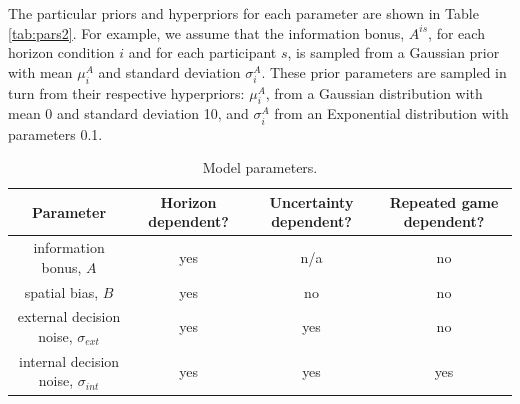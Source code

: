 \documentclass[12pt]{article}
\begin{document}
	The particular priors and hyperpriors for each parameter are shown in Table \ref{tab:pars2}. For example, we assume that the information bonus, $A^{is}$, for each horizon condition $i$ and for each participant $s$, is sampled from a Gaussian prior with mean $\mu^{A}_{i}$ and standard deviation $\sigma_{i}^A$. These prior parameters are sampled in turn from their respective hyperpriors: $\mu_{i}^{A}$, from a Gaussian distribution with mean 0 and standard deviation 10, and $\sigma_{i}^A$ from an Exponential distribution with parameters 0.1.
	\begin{table}[H]
		\small
		\begin{center}
			\begin{tabular}{|c|c|c|c|}
				\hline
				Parameter &
				Horizon dependent? &
				Uncertainty dependent? &
				Repeated game dependent? \\
				\hline
				information bonus, $A$ &
				yes &
				n/a &
				no \\
				\hline
				spatial bias, $B$ &
				yes &
				no &
				no \\
				\hline
				external decision noise, $\sigma_{ext}$ &
				yes & 
				yes &
				no \\
				\hline
				internal decision noise, $\sigma_{int}$ &
				yes & 
				yes &
				yes \\
				\hline
			\end{tabular}
		\end{center}
		\caption{Model parameters. }
		\label{para1}
	\end{table}%
	
\end{document}
